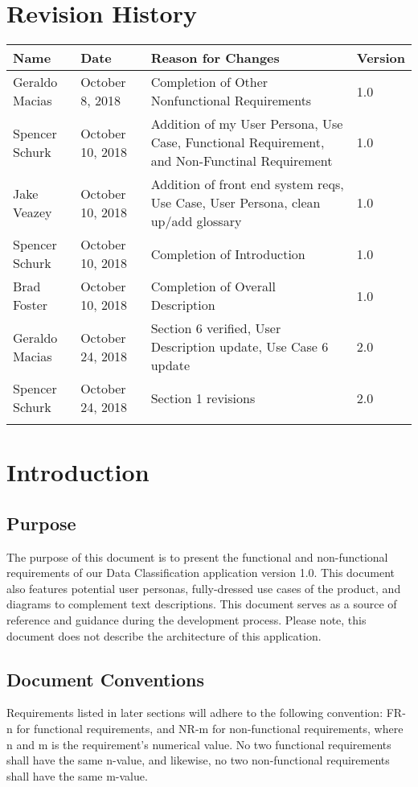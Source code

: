 \documentclass[12pt,oneside,letterpaper]{article}
\begin{document}
\section*{Revision History}
\begin{tabular}{|l|l|p{2.5in}|l|}
\hline
\textbf{Name}&\textbf{Date}&\textbf{Reason for Changes}&\textbf{Version}\\
\hline
Geraldo Macias&October 8, 2018&Completion of Other Nonfunctional Requirements&1.0\\
\hline
Spencer Schurk&October 10, 2018&Addition of my User Persona, Use Case, Functional Requirement, and Non-Functinal Requirement&1.0\\
\hline
Jake Veazey&October 10, 2018&Addition of \gls{front end} system reqs, Use Case, User Persona, clean up/add glossary&1.0\\
\hline
Spencer Schurk&October 10, 2018&Completion of Introduction&1.0\\
\hline
Brad Foster&October 10, 2018&Completion of Overall Description&1.0\\
\hline
Geraldo Macias&October 24, 2018&Section 6 verified, User Description update, Use Case 6 update&2.0\\
\hline
Spencer Schurk&October 24, 2018&Section 1 revisions&2.0\\
\hline
&&&\\
\hline
\end{tabular}

\newpage

\section{Introduction}
\subsection{Purpose}
The purpose of this document is to present the functional and non-functional requirements of our Data Classification application version 1.0. This document also features potential user personas, fully-dressed use cases of the product, and diagrams to complement text descriptions. This document serves as a source of reference and guidance during the development process. Please note, this document does not describe the architecture of this application.

\subsection{Document Conventions}
Requirements listed in later sections will adhere to the following convention: FR-n for functional requirements, and NR-m for non-functional requirements, where n and m is the requirement's numerical value. No two functional requirements shall have the same n-value, and likewise, no two non-functional requirements shall have the same m-value.
\end{document}
